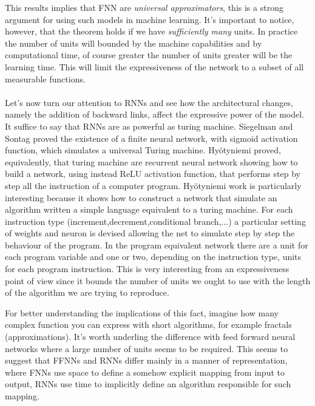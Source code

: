 This results implies that FNN are \textit{universal approximators}, this is a strong argument for using such models in machine learning.
It's important to notice, however, that the theorem holds if we have \textit{sufficiently many} units. In practice the number of units will bounded
by the machine capabilities and by computational time, of course greater the number of units greater will be the learning time. This will limit
the expressiveness of the network to a subset of all measurable functions. 
\\\\Let's now turn our attention to RNNs and see how the architectural changes, namely the addition of backward links, affect the expressive power of the model.
It suffice to say that RNNs are as powerful as turing machine. Siegelman and Sontag \cite{Siegelmann91turingcomputability} proved the existence 
of a finite neural network, with sigmoid activation function, which simulates a universal Turing machine. Hy{\"o}tyniemi \cite{Hyotyniemi96turingmachines} proved, equivalently,
that turing machine are recurrent neural network showing how to build a network, using instead ReLU activation function, that performs step by step 
all the instruction of a computer program.
Hy{\"o}tyniemi work is particularly interesting because it shows how to construct a network that simulate an algorithm written a simple language equivalent to a turing machine.
For each instruction type (increment,decrement,conditional branch,...) a particular setting of weights and neuron is devised allowing the net to simulate step by step the behaviour of the program. 
In the program equivalent network there are a unit for each program variable and one or two, depending on the instruction type, units for each program instruction.
This is very interesting from an expressiveness point of view since it bounds the number of units we ought to use with the length of the algorithm we are trying to reproduce.

For better understanding the implications of this fact, imagine how many complex function you can express with short algorithms, for example fractals (approximations).
It's worth underling the difference with feed forward neural networks where a large number of units seems to be required. This seems to suggest that FFNNs and RNNs differ mainly in a manner of 
representation, where FNNs use space to define a somehow explicit mapping from input to output, RNNs use time to implicitly define an algorithm responsible for such mapping. 

